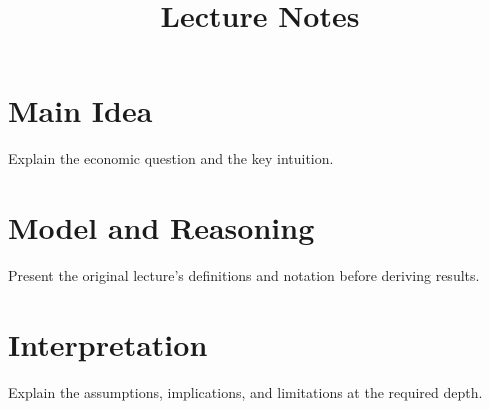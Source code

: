 \documentclass[11pt]{article}
\title{Lecture Notes}
\author{}
\date{}
\begin{document}
\maketitle

\section{Main Idea}

Explain the economic question and the key intuition.

\section{Model and Reasoning}

Present the original lecture's definitions and notation before deriving results.

\section{Interpretation}

Explain the assumptions, implications, and limitations at the required depth.
\end{document}
